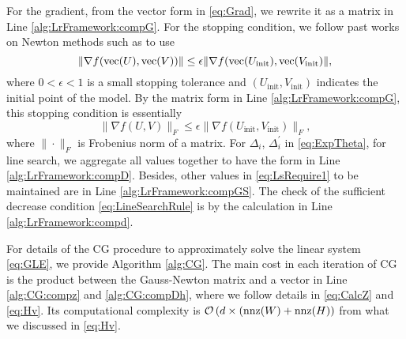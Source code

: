 For the gradient, from the vector form in \eqref{eq:Grad}, we rewrite it as a matrix in Line \ref{alg:LrFramework:compG}. 
For the stopping condition, we follow past works on Newton methods such as \citet{CJL07b} to use
\begin{equation}
    \|\nabla f(\operatorname*{vec}(U), \operatorname*{vec}(V))\| \le \epsilon \|\nabla f(\operatorname*{vec}(U_{\text{init}}),\operatorname*{vec}(V_{\text{init}})\|,
    \label{eq:AntStop}
\end{equation}
where $0<\epsilon<1$ is a small stopping tolerance and $(U_{\text{init}},V_{\text{init}})$ indicates the initial point of the model. By the matrix form in Line \ref{alg:LrFramework:compG}, this stopping condition is essentially 
\begin{equation}
    \|\nabla f(U,V)\|_F \le \epsilon \|\nabla f(U_{\text{init}},V_{\text{init}})\|_F,
    \label{eq:AntStopM}
\end{equation}
where $\|\cdot\|_F$ is Frobenius norm of a matrix.
For ${\Delta}_i$, ${\Delta}_i^\prime$ in \eqref{eq:ExpTheta}, for line search, we aggregate all values together to have the form in Line \ref{alg:LrFramework:compD}. Besides, other values in \eqref{eq:LsRequire1} to be maintained are in Line \ref{alg:LrFramework:compGS}. The check of the sufficient decrease condition \eqref{eq:LineSearchRule} is by the calculation in Line \ref{alg:LrFramework:compd}.

For details of the CG procedure to approximately solve the linear system \eqref{eq:GLE}, we provide Algorithm \ref{alg:CG}. The main cost in each iteration of CG is the product between the Gauss-Newton matrix and a vector in Line \ref{alg:CG:compz} and \ref{alg:CG:compDh}, where we follow details in \eqref{eq:CalcZ} and \eqref{eq:Hv}. Its computational complexity is $\mathcal{O}\left(d \times (\text{nnz}(W)+\text{nnz}(H)\right)$ from what we discussed in \eqref{eq:Hv}.


